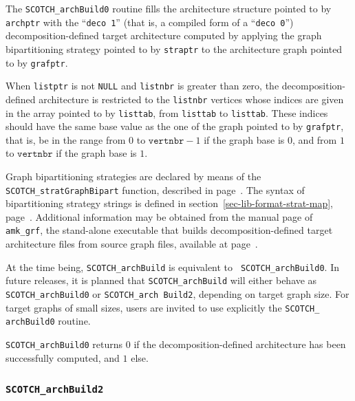 \begin{itemize}
\progdes

The {\tt SCOTCH\_archBuild0} routine fills the architecture structure
pointed to by {\tt archptr} with the ``\texttt{deco 1}'' (that is, a
compiled form of a ``\texttt{deco 0}'') decomposition-defined target
architecture computed by applying the graph bipartitioning strategy
pointed to by {\tt straptr} to the architecture graph pointed to by
{\tt grafptr}.

When {\tt listptr} is not {\tt NULL} and {\tt listnbr} is greater than
zero, the decomposition-defined architecture is restricted to the
{\tt listnbr} vertices whose indices are given in the array pointed to
by {\tt listtab}, from {\tt listtab\lbt [0]} to {\tt listtab\lbt
[listnbr - 1]}. These indices should have the same base value as the
one of the graph pointed to by {\tt grafptr}, that is, be in the
range from $0$ to $\mathtt{vertnbr} - 1$ if the graph base is
$0$, and from $1$ to $\mathtt{vertnbr}$ if the graph base is $1$.

Graph bipartitioning strategies are declared by means of the
{\tt SCOTCH\_\lbt strat\lbt Graph\lbt Bipart} function, described in
page~\pageref{sec-lib-strat-graph-bipart}. The syntax of bipartitioning
strategy strings is defined in section~\ref{sec-lib-format-strat-map},
page~\pageref{sec-lib-format-strat-map}.
Additional information may be obtained from the manual page of
{\tt amk\_\lbt grf}, the stand-alone executable that builds
decomposition-defined target architecture files from source graph
files, available at page~\pageref{sec-prog-amkgrf}.

At the time being, {\tt SCOTCH\_arch\lbt Build} is equivalent to {\tt
SCOTCH\_\lbt arch\lbt Build0}. In future releases, it is planned that
{\tt SCOTCH\_\lbt arch\lbt Build} will either behave as
{\tt SCOTCH\_\lbt arch\lbt Build0} or {\tt SCOTCH\_\lbt arch\lbt
Build2}, depending on target graph size. For target graphs of small
sizes, users are invited to use explicitly the {\tt SCOTCH\_\lbt
arch\lbt Build0} routine.

\progret

{\tt SCOTCH\_archBuild0} returns $0$ if the decomposition-defined
architecture has been successfully computed, and $1$ else.
\end{itemize}

\subsubsection{{\tt SCOTCH\_archBuild2}}
\label{sec-lib-arch-build-two}

